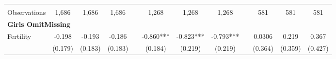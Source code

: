 \begin{landscape}
\begin{table}[htpb!]
\begin{center}
\begin{tabular}{lcccp{2mm}cccp{2mm}ccc}
\begin{footnotesize}\end{footnotesize}&\begin{footnotesize}\end{footnotesize}&\begin{footnotesize}\end{footnotesize}&\begin{footnotesize}\end{footnotesize}&\begin{footnotesize}\end{footnotesize}&\begin{footnotesize}\end{footnotesize}&\begin{footnotesize}\end{footnotesize}&\begin{footnotesize}\end{footnotesize}&\begin{footnotesize}\end{footnotesize}&\begin{footnotesize}\end{footnotesize}&\begin{footnotesize}\end{footnotesize}&\begin{footnotesize}\end{footnotesize}\\Observations&1,686&1,686&1,686&&1,268&1,268&1,268&&581&581&581\\
\multicolumn{12}{l}{\textbf{Girls OmitMissing}}\\ 
Fertility&-0.198&-0.193&-0.186&&-0.860***&-0.823***&-0.793***&&0.0306&0.219&0.367\\
&(0.179)&(0.183)&(0.183)&&(0.184)&(0.219)&(0.219)&&(0.364)&(0.359)&(0.427)\\

\end{tabular}
\end{center}
\end{table}
\end{landscape}
